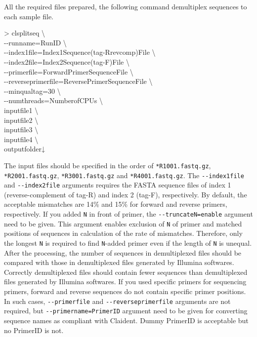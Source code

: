 \documentclass[titlepage,10pt,a4paper,english]{jsbook}
\newenvironment{cmd}{\begin{oframed}\raggedright\ttfamily\footnotesize\setlength{\baselineskip}{1.4em}}{\end{oframed}\vspace{-1em}}
\begin{document}
All the required files prepared, the following command demultiplex sequences to each sample file.
\begin{cmd}
{\textgreater} clsplitseq {\textbackslash}\\
{-}{-}runname=RunID {\textbackslash}\\
{-}{-}index1file=Index1Sequence(tag-Rrevcomp)File {\textbackslash}\\
{-}{-}index2file=Index2Sequence(tag-F)File {\textbackslash}\\
{-}{-}primerfile=ForwardPrimerSequenceFile {\textbackslash}\\
{-}{-}reverseprimerfile=ReversePrimerSequenceFile {\textbackslash}\\
{-}{-}minqualtag=30 {\textbackslash}\\
{-}{-}numthreads=NumberofCPUs {\textbackslash}\\
inputfile1 {\textbackslash}\\
inputfile2 {\textbackslash}\\
inputfile3 {\textbackslash}\\
inputfile4 {\textbackslash}\\
outputfolder↓
\end{cmd}
The input files should be specified in the order of \texttt{*{\textunderscore}R1{\textunderscore}001.fastq.gz}, \texttt{*{\textunderscore}R2{\textunderscore}001.fastq.gz}, \texttt{*{\textunderscore}R3{\textunderscore}001.fastq.gz} and \texttt{*{\textunderscore}R4{\textunderscore}001.fastq.gz}.
The \texttt{{-}{-}index1file} and \texttt{{-}{-}index2file} arguments requires the FASTA sequence files of index 1 (reverse-complement of tag-R) and index 2 (tag-F), respectively.
By default, the acceptable mismatches are 14\% and 15\% for forward and reverse primers, respectively.
If you added \texttt{N} in front of primer, the \texttt{{-}{-}truncateN=enable} argument need to be given.
This argument enables exclusion of \texttt{N} of primer and matched positions of sequences in calculation of the rate of mismatches.
Therefore, only the longest \texttt{N} is required to find \texttt{N}-added primer even if the length of \texttt{N} is unequal.
After the processing, the number of sequences in demultiplexed files should be compared with those in demultiplexed files generated by Illumina softwares.
Correctly demultiplexed files should contain fewer sequences than demultiplexed files generated by Illumina softwares.
If you used specific primers for sequencing primers, forward and reverse sequences do not contain specific primer positions.
In such cases, \texttt{{-}{-}primerfile} and \texttt{{-}{-}reverseprimerfile} arguments are not required, but \texttt{{-}{-}primername=PrimerID} argument need to be given for converting sequence names as compliant with Claident.
Dummy PrimerID is acceptable but no PrimerID is not.
\end{document}
